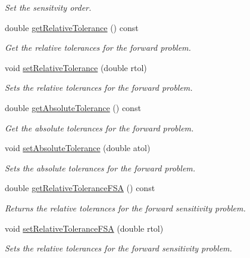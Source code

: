 \begin{DoxyCompactItemize}
\begin{DoxyCompactList}\small\item\em Set the sensitvity order. \end{DoxyCompactList}\item 
double \mbox{\hyperlink{classamici_1_1_solver_a54fe1b062315ed19b2dbf88206415e06}{get\+Relative\+Tolerance}} () const
\begin{DoxyCompactList}\small\item\em Get the relative tolerances for the forward problem. \end{DoxyCompactList}\item 
void \mbox{\hyperlink{classamici_1_1_solver_afb5f0c48f24e4bc3efad8ef599adde56}{set\+Relative\+Tolerance}} (double rtol)
\begin{DoxyCompactList}\small\item\em Sets the relative tolerances for the forward problem. \end{DoxyCompactList}\item 
double \mbox{\hyperlink{classamici_1_1_solver_a676df944b6737474dd4ef74fe9212f3e}{get\+Absolute\+Tolerance}} () const
\begin{DoxyCompactList}\small\item\em Get the absolute tolerances for the forward problem. \end{DoxyCompactList}\item 
void \mbox{\hyperlink{classamici_1_1_solver_afe0fd2fad6ce110ad8421f5979945f90}{set\+Absolute\+Tolerance}} (double atol)
\begin{DoxyCompactList}\small\item\em Sets the absolute tolerances for the forward problem. \end{DoxyCompactList}\item 
double \mbox{\hyperlink{classamici_1_1_solver_acf203e64c34e2d20a6fd563029c19b57}{get\+Relative\+Tolerance\+F\+SA}} () const
\begin{DoxyCompactList}\small\item\em Returns the relative tolerances for the forward sensitivity problem. \end{DoxyCompactList}\item 
void \mbox{\hyperlink{classamici_1_1_solver_af82e072706f6bc6819c154b86bec309f}{set\+Relative\+Tolerance\+F\+SA}} (double rtol)
\begin{DoxyCompactList}\small\item\em Sets the relative tolerances for the forward sensitivity problem. \end{DoxyCompactList}\item 

\end{DoxyCompactItemize}
